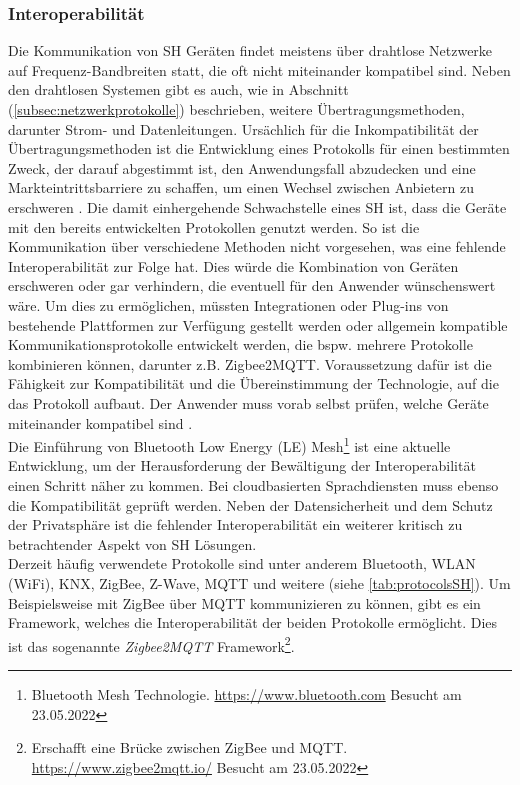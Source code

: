         \subsubsection*{Interoperabilität}
            Die Kommunikation von \acl{SH} Geräten findet meistens über drahtlose Netzwerke auf Frequenz-Bandbreiten statt, die oft nicht 
            miteinander kompatibel sind. Neben den drahtlosen Systemen gibt es auch, wie in Abschnitt (\ref{subsec:netzwerkprotokolle}) beschrieben, 
            weitere Übertragungsmethoden, darunter Strom- und Datenleitungen. Ursächlich für die Inkompatibilität der Übertragungsmethoden 
            ist die Entwicklung eines Protokolls für einen bestimmten 
            Zweck, der darauf abgestimmt ist, den Anwendungsfall abzudecken und eine Markteintrittsbarriere zu 
            schaffen, um einen Wechsel zwischen Anbietern zu erschweren \cite{statista2021}. 
            Die damit einhergehende Schwachstelle eines \acl{SH} ist, dass die Geräte mit den bereits entwickelten 
            Protokollen genutzt werden. So ist die Kommunikation über verschiedene Methoden nicht vorgesehen, was 
            eine fehlende Interoperabilität zur Folge hat. Dies würde die Kombination von Geräten erschweren oder gar verhindern, die eventuell 
            für den Anwender wünschenswert wäre. Um dies zu ermöglichen, müssten Integrationen 
            oder Plug-ins von bestehende Plattformen zur Verfügung gestellt werden oder allgemein kompatible Kommunikationsprotokolle 
            entwickelt werden, die bspw. mehrere Protokolle kombinieren können, darunter z.B. Zigbee2MQTT. 
            Voraussetzung dafür ist die Fähigkeit zur Kompatibilität und die Übereinstimmung der Technologie, auf die das Protokoll aufbaut.
            Der Anwender muss vorab selbst prüfen, welche Geräte miteinander kompatibel sind \cite{statista2021}.
            \\
            \linebreak
            Die Einführung von Bluetooth Low Energy (LE) Mesh\footnote{Bluetooth Mesh Technologie. \url{https://www.bluetooth.com} Besucht am 23.05.2022} 
            ist eine aktuelle Entwicklung, um der Herausforderung der Bewältigung der Interoperabilität einen Schritt näher zu kommen. Bei cloudbasierten 
            Sprachdiensten muss ebenso die Kompatibilität geprüft werden. 
            Neben der Datensicherheit und dem Schutz der Privatsphäre ist die fehlender Interoperabilität ein weiterer kritisch zu betrachtender Aspekt von 
            \acs{SH} Lösungen.
            \\ 
            \linebreak
            Derzeit häufig verwendete Protokolle sind unter anderem Bluetooth, \ac{WLAN} (WiFi), KNX, ZigBee, Z-Wave, 
            MQTT und weitere (siehe \ref{tab:protocolsSH}). Um Beispielsweise mit ZigBee über \acs{MQTT} kommunizieren zu 
            können, gibt es ein Framework, welches die Interoperabilität der beiden Protokolle ermöglicht. Dies ist das 
            sogenannte \textit{Zigbee2MQTT} Framework\footnote{Erschafft eine Brücke zwischen ZigBee und MQTT. \url{https://www.zigbee2mqtt.io/} Besucht am 23.05.2022}.
